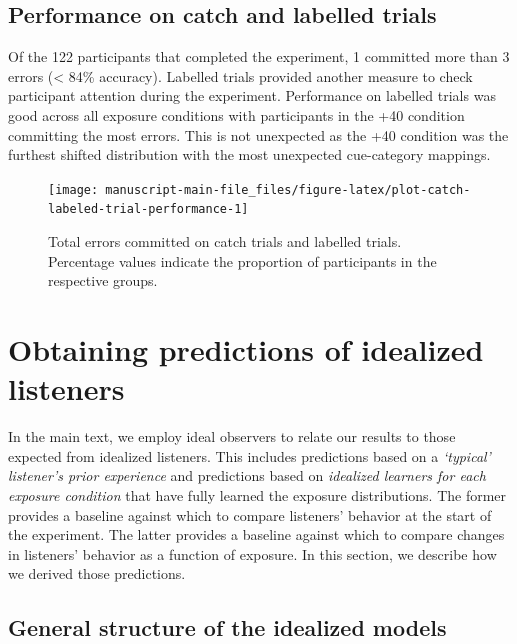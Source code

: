 \documentclass[
  11pt,
  man,mask,floatsintext]{apa6}
\begin{document}
\subsection{Performance on catch and labelled trials}\label{performance-on-catch-and-labelled-trials}

Of the 122 participants that completed the experiment, 1 committed more than 3 errors (\textless{} 84\% accuracy). Labelled trials provided another measure to check participant attention during the experiment. Performance on labelled trials was good across all exposure conditions with participants in the +40 condition committing the most errors. This is not unexpected as the +40 condition was the furthest shifted distribution with the most unexpected cue-category mappings.



\begin{figure}

{\centering \texttt{[image: manuscript-main-file\_files/figure-latex/plot-catch-labeled-trial-performance-1]} 

}

\caption{Total errors committed on catch trials and labelled trials. Percentage values indicate the proportion of participants in the respective groups.}\label{fig:plot-catch-labeled-trial-performance}
\end{figure}

\section{Obtaining predictions of idealized listeners}\label{obtaining-predictions-of-idealized-listeners}

In the main text, we employ ideal observers to relate our results to those expected from idealized listeners. This includes predictions based on a \emph{`typical' listener's prior experience} and predictions based on \emph{idealized learners for each exposure condition} that have fully learned the exposure distributions. The former provides a baseline against which to compare listeners' behavior at the start of the experiment. The latter provides a baseline against which to compare changes in listeners' behavior as a function of exposure. In this section, we describe how we derived those predictions.

\subsection{General structure of the idealized models}\label{sec:ASP}
\end{document}
